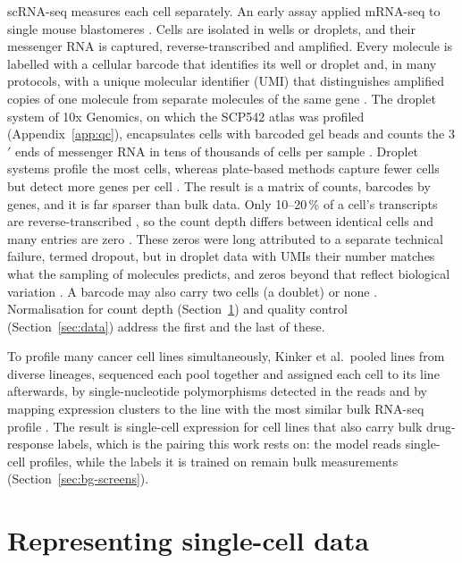 scRNA-seq measures each cell separately. An early assay applied mRNA-seq to
single mouse blastomeres \cite{tang2009}. Cells are isolated in wells or droplets,
and their messenger RNA is captured, reverse-transcribed and amplified. Every molecule is labelled with a
cellular barcode that identifies its well or droplet and, in many protocols, with a unique molecular
identifier (UMI) that distinguishes amplified copies of one molecule from separate molecules of the same
gene \cite{luecken2019}. The droplet system of 10x Genomics, on which the SCP542 atlas was profiled
(Appendix~\ref{app:qc}), encapsulates cells with barcoded gel beads and counts the 3$'$ ends of
messenger RNA in tens of thousands of cells per sample \cite{zheng2017}. Droplet systems profile the
most cells, whereas plate-based methods capture fewer cells but detect more genes per cell
\cite{stark2019}. The result is a matrix of counts, barcodes by genes, and it is far sparser than bulk
data. Only 10--20\,\% of a cell's transcripts are reverse-transcribed \cite{stark2019}, so the count
depth differs between identical cells and many entries are zero \cite{luecken2019}. These zeros were long
attributed to a separate technical failure, termed dropout, but in droplet data with UMIs their number
matches what the sampling of molecules predicts, and zeros beyond that reflect biological variation
\cite{svensson2020}. A barcode may also carry two cells (a doublet) or none \cite{luecken2019}.
Normalisation for count depth (Section~\ref{sec:bg-representation}) and quality control
(Section~\ref{sec:data}) address the first and the last of these.

To profile many cancer cell lines simultaneously, Kinker et al.\ pooled lines from diverse lineages,
sequenced each pool together and assigned each cell to its line afterwards, by single-nucleotide polymorphisms
detected in the reads and by mapping expression clusters to the line with the most similar bulk RNA-seq
profile \cite{scp542}. The result is single-cell expression for cell lines that also carry bulk drug-response
labels, which is the pairing this work rests on: the model reads single-cell profiles, while the labels
it is trained on remain bulk measurements (Section~\ref{sec:bg-screens}).

\section{Representing single-cell data}
\label{sec:bg-representation}


